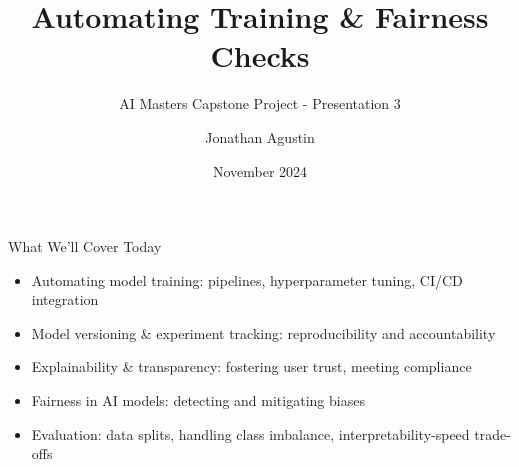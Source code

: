 \documentclass[aspectratio=169]{beamer}
\title{Automating Training \& Fairness Checks}
\subtitle{AI Masters Capstone Project - Presentation 3}
\author{Jonathan Agustin}
\date{November 2024}
\begin{document}

\maketitle



\begin{frame}{What We’ll Cover Today}
\begin{itemize}
\item Automating model training: pipelines, hyperparameter tuning, CI/CD integration
\item Model versioning \& experiment tracking: reproducibility and accountability
\item Explainability \& transparency: fostering user trust, meeting compliance
\item Fairness in AI models: detecting and mitigating biases
\item Evaluation: data splits, handling class imbalance, interpretability-speed trade-offs
\end{itemize}
\end{frame}
\end{document}
